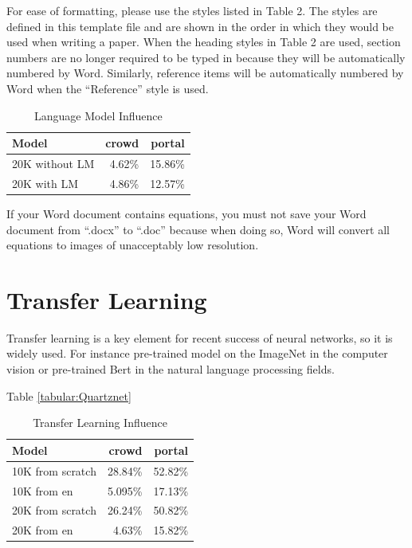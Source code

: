 \documentclass[a4paper]{article}
\begin{document}
For ease of formatting, please use the styles listed in Table 2. The styles are defined in this template file and are shown in the order in which they would be used when writing a paper. When the heading styles in Table 2 are used, section numbers are no longer required to be typed in because they will be automatically numbered by Word. Similarly, reference items will be automatically numbered by Word when the ``Reference'' style is used.

\begin{table}[t]
  \caption{Language Model Influence}
  \label{tab:word_styles}
  \centering
  \begin{tabular}{lrr}
    \toprule
    \textbf{Model}      & \textbf{crowd}     & \textbf{portal}    \\
    \midrule
    20K without LM   &  4.62\%    & 15.86\%                                \\
    20K  with LM     & 4.86\%       & 12.57\%                         \\

    \bottomrule
  \end{tabular}
\end{table}

If your Word document contains equations, you must not save your Word document from ``.docx'' to ``.doc'' because when doing so, Word will convert all equations to images of unacceptably low resolution.

\section{Transfer Learning}

Transfer learning is a key element for recent success of neural networks, so it is widely used. For instance pre-trained model on the ImageNet in the computer vision or pre-trained Bert in the natural language processing fields. 


Table \ref{tabular:Quartznet} 

\begin{table}[t]
  \caption{Transfer Learning Influence}
  \label{tab:word_styles}
  \centering
  \begin{tabular}{lrr}
    \toprule
    \textbf{Model}      & \textbf{crowd}     & \textbf{portal}    \\
    \midrule
    10K from scratch   &  28.84\%   & 52.82\% \\
    10K from en    & 5.095\%       & 17.13\%  \\
    \midrule
    20K from scratch   &  26.24\%   & 50.82\% \\
    20K from en    & 4.63\%       & 15.82\% \\
    \bottomrule
  \end{tabular}
\end{table}
\end{document}

